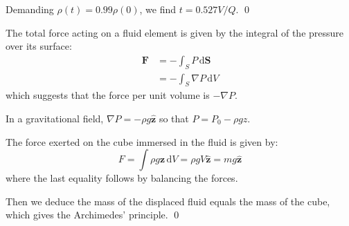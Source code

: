 \documentclass[12pt]{article}
\begin{document}
Demanding $\rho(t) = 0.99 \rho(0)$, we find $t = 0.527 V/Q$.
\qed



The total force acting on a fluid element is given by the integral of the pressure over its surface:
\begin{equation}
    \begin{split}
        \mathbf{F} &= -\int_{S} P \, \mathrm{d}\mathbf{S} \\
        &= -\int_{S} \nabla P \, \mathrm{d}V
    \end{split}
\end{equation}
which suggests that the force per unit volume is $-\nabla P$.

In a gravitational field, $\nabla P = -\rho g \hat{\mathbf{z}}$ so that $P = P_{0} - \rho g z$.

The force exerted on the cube immersed in the fluid is given by:
\begin{equation}
    F = \int \rho g \mathbf{z} \, \mathrm{d}V = \rho g V \hat{\mathbf{z}} = mg \hat{\mathbf{z}}
\end{equation}
where the last equality follows by balancing the forces.

Then we deduce the mass of the displaced fluid equals the mass of the cube, which gives the Archimedes' principle.
\qed
\end{document}
